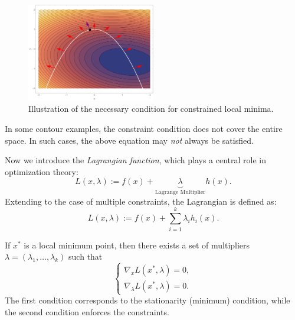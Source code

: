 \documentclass[../main]{subfiles}
\begin{document}
\begin{figure}[H]
    \centering
    \includegraphics[width=0.5\textwidth]{../../fig/fig1.pdf}
    \caption{Illustration of the necessary condition for constrained local minima.}
    \label{2-lr}
\end{figure}

\begin{remark}
    In some contour examples, the constraint condition does not cover the entire space.  
    In such cases, the above equation may \emph{not} always be satisfied.
\end{remark}

Now we introduce the \emph{Lagrangian function}, which plays a central role in optimization theory:
\begin{equation}
    L(x, \lambda) := f(x) + \underbrace{\lambda}_{\text{Lagrange Multiplier}} h(x).
\end{equation}
Extending to the case of multiple constraints, the Lagrangian is defined as:
\begin{equation}
    L(x,\lambda) := f(x) + \sum_{i=1}^k \lambda_i h_i(x).
\end{equation}

\begin{theorem}
    If $x^*$ is a local minimum point, then there exists a set of multipliers $\lambda = (\lambda_1,\dots,\lambda_k)$ such that
    \begin{equation}
        \begin{cases}
            \nabla_x L(x^*, \lambda) = 0, \\
            \nabla_\lambda L(x^*, \lambda) = 0.
        \end{cases}
    \end{equation}
    The first condition corresponds to the stationarity (minimum) condition, while the second condition enforces the constraints.
\end{theorem}
\end{document}
